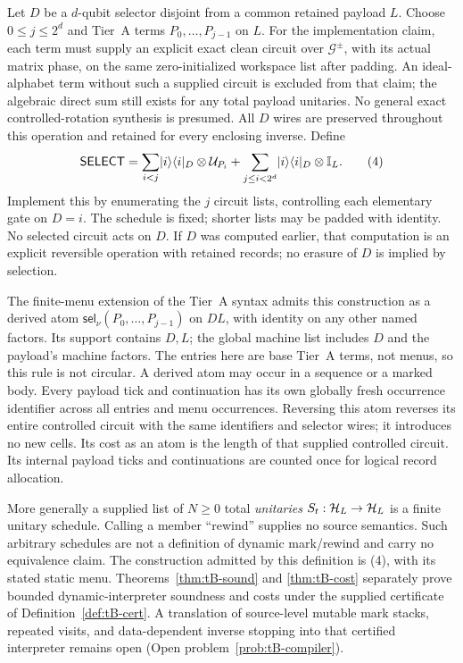 \begin{definition}
\label{def:tierb}
Let $D$ be a $d$-qubit selector disjoint from a common retained payload
$L$. Choose $0\leq j\leq2^d$ and Tier~A terms $P_0,\ldots,P_{j-1}$
on $L$. For the implementation claim, each term must supply an explicit
exact clean circuit over $\mathcal G^{\pm}$, with its actual matrix
phase, on the same zero-initialized workspace list after padding.
An ideal-alphabet term without such a supplied circuit is excluded from
that claim; the algebraic direct sum still exists for any total payload
unitaries. No general exact controlled-rotation synthesis is presumed.
All $D$ wires are preserved throughout this operation and retained for
every enclosing inverse. Define
\[
 \mathsf{SELECT}=
 \sum_{i<j}\lvert i\rangle\langle i\rvert_D\otimes\mathcal U_{P_i}+
 \sum_{j\leq i<2^d}\lvert i\rangle\langle i\rvert_D\otimes\mathbb{I}_L.                  \tag{4}
\]
Implement this by enumerating the $j$ circuit lists, controlling each
elementary gate on $D=i$. The schedule is fixed; shorter lists may be
padded with identity. No selected circuit acts on $D$. If $D$ was
computed earlier, that computation is an explicit reversible operation
with retained records; no erasure of $D$ is implied by selection.

The finite-menu extension of the Tier~A syntax admits this construction
as a derived atom $\mathsf{sel}_\nu(P_0,\ldots,P_{j-1})$ on $DL$,
with identity on any other named factors. Its support contains $D,L$;
the global machine list includes $D$ and the payload's machine factors.
The entries here are base Tier~A terms, not menus, so this rule is not
circular. A derived atom may occur in a sequence or a marked body.
Every payload tick and continuation has its own globally fresh occurrence
identifier across all entries and menu occurrences. Reversing this atom
reverses its entire controlled circuit with the same identifiers and
selector wires; it introduces no new cells. Its cost as an atom is the
length of that supplied controlled circuit. Its internal payload ticks
and continuations are counted once for logical record allocation.

More generally a supplied list of $N\geq0$ total \emph{unitaries}
$S_t:\mathcal{H}_L\to\mathcal{H}_L$ is a finite unitary schedule. Calling a member
``rewind'' supplies no source semantics. Such arbitrary schedules are
not a definition of dynamic mark/rewind and carry no equivalence claim.
The construction admitted by this definition is (4), with its stated
static menu. Theorems~\ref{thm:tB-sound} and \ref{thm:tB-cost} separately
prove bounded dynamic-interpreter soundness and costs under the supplied
certificate of Definition~\ref{def:tB-cert}. A translation of source-level
mutable mark stacks, repeated visits, and data-dependent inverse stopping
into that certified interpreter remains open
(Open problem~\ref{prob:tB-compiler}).
\end{definition}


